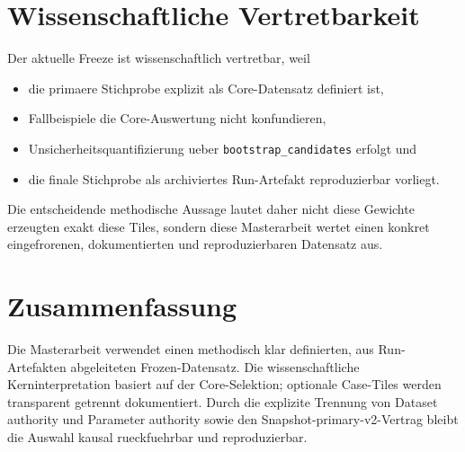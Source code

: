 \section{Wissenschaftliche Vertretbarkeit}
\label{sec:scientific_justification}

Der aktuelle Freeze ist wissenschaftlich vertretbar, weil

\begin{itemize}
    \item die primaere Stichprobe explizit als Core-Datensatz definiert ist,
    \item Fallbeispiele die Core-Auswertung nicht konfundieren,
    \item Unsicherheitsquantifizierung ueber
          \texttt{bootstrap\_candidates} erfolgt und
    \item die finale Stichprobe als archiviertes Run-Artefakt reproduzierbar
          vorliegt.
\end{itemize}

Die entscheidende methodische Aussage lautet daher nicht
\glqq diese Gewichte erzeugten exakt diese Tiles\grqq, sondern
\glqq diese Masterarbeit wertet einen konkret eingefrorenen, dokumentierten und
reproduzierbaren Datensatz aus\grqq.

\section{Zusammenfassung}
\label{sec:summary_training_data}

Die Masterarbeit verwendet einen methodisch klar definierten, aus Run-Artefakten
abgeleiteten Frozen-Datensatz. Die wissenschaftliche Kerninterpretation basiert
auf der Core-Selektion; optionale Case-Tiles werden transparent getrennt
dokumentiert. Durch die explizite Trennung von Dataset authority und Parameter
authority sowie den Snapshot-primary-v2-Vertrag bleibt die Auswahl kausal
rueckfuehrbar und reproduzierbar.
